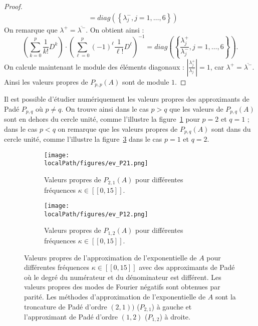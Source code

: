 \begin{proof}
$$\begin{aligned}
                                                     & = diag\left(\left\{ \lambda^-_j , j=1,\dots,6 \right\}\right)
    \end{aligned}
  $$
  On remarque que $\lambda^+ = \overline{\lambda^-}$. On obtient ainsi :
  $$
    \left( \sum_{k=0}^p \frac{1}{k!}D^k \right) \cdot \left(\sum_{\ell=0}^p (-1)^\ell \frac{1}{\ell!}D^\ell \right)^{-1}
    =
    diag\left(\left\{ \frac{\lambda_j^+}{\lambda_j^-} , j=1,\dots,6\right\}\right).
  $$
  On calcule maintenant le module des éléments diagonaux : $\left|\frac{\lambda_j^+}{\lambda_j^-}\right| = 1$, car $\lambda^+ = \overline{\lambda^-}$. Ainsi les valeurs propres de $P_{p,p}(A)$ sont de module $1$.
\end{proof}

Il est possible d'étudier numériquement les valeurs propres des approximants de Padé $P_{p,q}$ où $p\neq q$. On trouve ainsi dans le cas $p>q$ que les valeurs de $P_{p,q}(A)$ sont en dehors du cercle unité, comme l'illustre la figure~\ref{fig:ev:P21} pour $p=2$ et $q=1$ ; dans le cas $p<q$ on remarque que les valeurs propres de $P_{p,q}(A)$ sont dans du cercle unité, comme l'illustre la figure~\ref{fig:ev:P12} dans le cas $p=1$ et $q=2$.

\begin{figure}
  \begin{subfigure}{.5\textwidth}
    \centering
    \texttt{[image: \\localPath/figures/ev\_P21.png]}
    \caption{Valeurs propres de $P_{2,1}(A)$ pour différentes fréquences $\kappa\in[\![0,15]\!]$.}
    \label{fig:ev:P21}
  \end{subfigure}
  \begin{subfigure}{.5\textwidth}
    \texttt{[image: \\localPath/figures/ev\_P12.png]}
    \caption{Valeurs propres de $P_{1,2}(A)$ pour différentes fréquences $\kappa\in[\![0,15]\!]$.}
    \label{fig:ev:P12}
  \end{subfigure}
  \caption{Valeurs propres de l'approximation de l'exponentielle de $A$ pour différentes fréquences $\kappa\in[\![0,15]\!]$ avec des approximants de Padé où le degré du numérateur et du dénominateur est différent. Les valeurs propres des modes de Fourier négatifs sont obtenues par parité. Les méthodes d'approximation de l'exponentielle de $A$ sont la troncature de Padé d'ordre $(2,1))$ ($P_{2,1}$) à gauche et l'approximant de Padé d'ordre $(1,2)$ ($P_{1,2}$) à droite.}
\end{figure}


